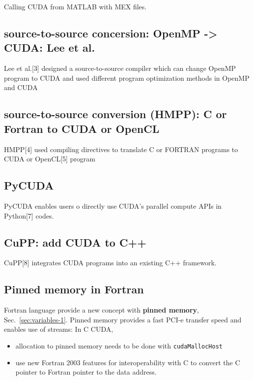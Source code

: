 Calling CUDA from MATLAB with MEX files.

\subsection{source-to-source concersion: OpenMP -> CUDA: Lee et al.}

Lee et al.[3] designed a source-to-source compiler which can change OpenMP
program to CUDA and used different program optimization methods in OpenMP and
CUDA

\subsection{source-to-source conversion (HMPP): C or Fortran to CUDA or OpenCL}
\label{sec:HMPP}

HMPP[4] used compiling directives to translate C or FORTRAN programs to CUDA or OpenCL[5] program

\subsection{PyCUDA}

PyCUDA enables users o directly use CUDA’s parallel compute APIs in Python[7]
codes.

\subsection{CuPP: add CUDA to C++}
\label{sec:CuPP}

CuPP[8] integrates CUDA programs into an existing C++ framework.

\subsection{Pinned memory in Fortran}
\label{sec:pinn-memory-fortr}

Fortran language provide a new concept with {\bf pinned memory},
Sec.~\ref{sec:variables-1}.  Pinned memory provides a fast PCI-e
transfer speed and enables use of streams: In C CUDA, 
\begin{itemize}
\item allocation to pinned memory needs to be done with
  \verb!cudaMallocHost!
\item use new Fortran 2003 features for interoperability with C to
  convert the C pointer to Fortran pointer to the data address.
\end{itemize}

